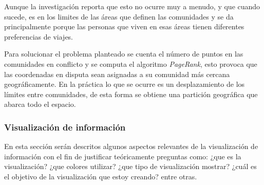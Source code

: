 \documentclass[12pt]{article}
\begin{document}
Aunque la investigación reporta que esto no ocurre muy a menudo, y que cuando sucede, es en los limites de las áreas que definen las comunidades y se da principalmente porque las personas que viven en esas áreas tienen diferentes preferencias de viajes.

Para solucionar el problema planteado se cuenta el número de puntos en las comunidades en conflicto y se computa el algoritmo \textit{PageRank}, esto provoca que las coordenadas en disputa sean asignadas a su comunidad más cercana geográficamente. En la práctica lo que se ocurre es un desplazamiento de los límites entre comunidades, de esta forma se obtiene una partición geográfica que abarca todo el espacio.
    





    
	\subsubsection{Visualización de información}    
    
	En esta sección serán descritos algunos aspectos relevantes de la visualización de información con el fin de justificar teóricamente preguntas como: ¿que es la visualización? ¿que colores utilizar? ¿que tipo de visualización mostrar? ¿cuál es el objetivo de la visualización que estoy creando? entre otras. 
	
\end{document}
